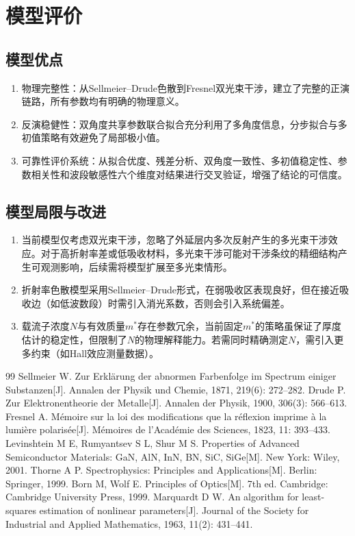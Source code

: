\documentclass[12pt,a4paper]{ctexart}
\begin{document}
	\newpage
	\section{模型评价}
	
	\subsection{模型优点}
	\begin{enumerate}[leftmargin=2em]
		\item 物理完整性：从Sellmeier–Drude色散到Fresnel双光束干涉，建立了完整的正演链路，所有参数均有明确的物理意义。
		\item 反演稳健性：双角度共享参数联合拟合充分利用了多角度信息，分步拟合与多初值策略有效避免了局部极小值。
		\item 可靠性评价系统：从拟合优度、残差分析、双角度一致性、多初值稳定性、参数相关性和波段敏感性六个维度对结果进行交叉验证，增强了结论的可信度。
	\end{enumerate}
	
	\subsection{模型局限与改进}
	\begin{enumerate}[leftmargin=2em]
		\item 当前模型仅考虑双光束干涉，忽略了外延层内多次反射产生的多光束干涉效应。对于高折射率差或低吸收材料，多光束干涉可能对干涉条纹的精细结构产生可观测影响，后续需将模型扩展至多光束情形。
		\item 折射率色散模型采用Sellmeier–Drude形式，在弱吸收区表现良好，但在接近吸收边（如低波数段）时需引入消光系数，否则会引入系统偏差。
		\item 载流子浓度$N$与有效质量$m^*$存在参数冗余，当前固定$m^*$的策略虽保证了厚度估计的稳定性，但限制了$N$的物理解释能力。若需同时精确测定$N$，需引入更多约束（如Hall效应测量数据）。
	\end{enumerate}
	
	\newpage
	\begin{thebibliography}{99}
		 Sellmeier W. Zur Erklärung der abnormen Farbenfolge im Spectrum einiger Substanzen[J]. Annalen der Physik und Chemie, 1871, 219(6): 272--282.
		 Drude P. Zur Elektronentheorie der Metalle[J]. Annalen der Physik, 1900, 306(3): 566--613.
		 Fresnel A. Mémoire sur la loi des modifications que la réflexion imprime à la lumière polarisée[J]. Mémoires de l'Académie des Sciences, 1823, 11: 393--433.
		 Levinshtein M E, Rumyantsev S L, Shur M S. Properties of Advanced Semiconductor Materials: GaN, AlN, InN, BN, SiC, SiGe[M]. New York: Wiley, 2001.
		 Thorne A P. Spectrophysics: Principles and Applications[M]. Berlin: Springer, 1999.
		 Born M, Wolf E. Principles of Optics[M]. 7th ed. Cambridge: Cambridge University Press, 1999.
		 Marquardt D W. An algorithm for least-squares estimation of nonlinear parameters[J]. Journal of the Society for Industrial and Applied Mathematics, 1963, 11(2): 431--441.
	\end{thebibliography}
	
\end{document}
